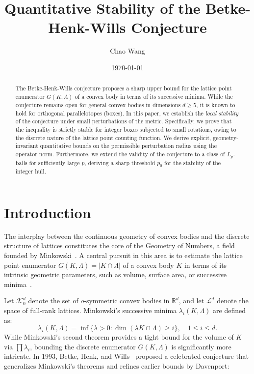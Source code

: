 \documentclass[11pt, reqno]{amsart}
\title[Quantitative Stability of Betke-Henk-Wills]{Quantitative Stability of the Betke-Henk-Wills Conjecture}
\author{Chao Wang}
\date{\today}
\theoremstyle{definition}
\newcommand{\R}{\mathbb{R}}
\newcommand{\K}{\mathcal{K}}
\begin{document}
\begin{abstract}
The Betke-Henk-Wills conjecture proposes a sharp upper bound for the lattice point enumerator $G(K, \Lambda)$ of a convex body in terms of its successive minima. While the conjecture remains open for general convex bodies in dimensions $d \ge 5$, it is known to hold for orthogonal parallelotopes (boxes). In this paper, we establish the \textit{local stability} of the conjecture under small perturbations of the metric. Specifically, we prove that the inequality is strictly stable for integer boxes subjected to small rotations, owing to the discrete nature of the lattice point counting function. We derive explicit, geometry-invariant quantitative bounds on the permissible perturbation radius using the operator norm. Furthermore, we extend the validity of the conjecture to a class of $L_p$-balls for sufficiently large $p$, deriving a sharp threshold $p_0$ for the stability of the integer hull.
\end{abstract}

\maketitle



\section{Introduction}

The interplay between the continuous geometry of convex bodies and the discrete structure of lattices constitutes the core of the Geometry of Numbers, a field founded by Minkowski~\cite{minkowski1910geometrie}. A central pursuit in this area is to estimate the lattice point enumerator $G(K, \Lambda) = |K \cap \Lambda|$ of a convex body $K$ in terms of its intrinsic geometric parameters, such as volume, surface area, or successive minima~\cite{ gruber1979geometry}.

Let $\K^d_0$ denote the set of $o$-symmetric convex bodies in $\R^d$, and let $\mathcal{L}^d$ denote the space of full-rank lattices. Minkowski's successive minima $\lambda_i(K, \Lambda)$ are defined as:
\[
\lambda_i(K, \Lambda) = \inf \{ \lambda > 0 : \dim(\lambda K \cap \Lambda) \ge i \}, \quad 1 \le i \le d.
\]
While Minkowski's second theorem provides a tight bound for the volume of $K$ via $\prod \lambda_i$, bounding the discrete enumerator $G(K, \Lambda)$ is significantly more intricate. In 1993, Betke, Henk, and Wills~\cite{betke1993successive} proposed a celebrated conjecture that generalizes Minkowski's theorems and refines earlier bounds by Davenport:
\end{document}
